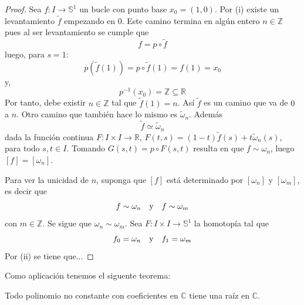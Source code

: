 \documentclass[12pt]{report}
\theoremstyle{largebreak}
\newcommand\cf[3]{\ensuremath{#1:#2\rightarrow#3}}
\begin{document}
    \begin{proof}
        Sea $\cf{f}{I}{\mathbb{S}^1}$ un bucle con punto base $x_0=(1,0)$. Por (i) existe un levantamiento $\widetilde{f}$ empezando en $0$. Este camino termina en algún entero $n\in\mathbb{Z}$ pues al ser levantamiento se cumple que
        \begin{equation*}
            f = p\circ \widetilde{f}
        \end{equation*}
        luego, para $s=1$:
        \begin{equation*}
            p(\widetilde{f}(1))=p\circ\widetilde{f}(1)=f(1)=x_0
        \end{equation*}
        y,
        \begin{equation*}
            p^{-1}(x_0)=\mathbb{Z}\subseteq\mathbb{R}
        \end{equation*}
        Por tanto, debe existir $n\in\mathbb{Z}$ tal que $\widetilde{f}(1)=n$. Así $\widetilde{f}$ es un camino que va de $0$ a $n$. Otro camino que también hace lo mismo es $\widetilde{\omega}_n$. Además
        \begin{equation*}
            \widetilde{f}\simeq \widetilde{\omega}_n
        \end{equation*}
        dada la función continua $\cf{F}{I\times I}{\mathbb{R}}$, $F(t,s)=(1-t)\widetilde{f}(s)+t\widetilde{\omega}_n(s)$, para todo $s,t\in I$. Tomando $G(s,t)=p\circ F(s,t)$ resulta en que $f\sim\omega_n$, luego $[f]=[\omega_n]$.

        Para ver la unicidad de $n$, suponga que $[f]$ está determinado por $[\omega_n]$ y $[\omega_m]$, es decir que
        \begin{equation*}
            f\sim\omega_n\quad\textup{y}\quad f\sim\omega_m
        \end{equation*}
        con $m\in\mathbb{Z}$. Se sigue que $\omega_n\sim\omega_m$. Sea $\cf{F}{I\times I}{\mathbb{S}^1}$ la homotopía tal que
        \begin{equation*}
            f_0=\omega_n\quad\textup{y}\quad f_1=\omega_m
        \end{equation*}
        Por (ii) se tiene que...
    \end{proof}

    Como aplicación tenemos el siguente teorema:

    \begin{theor}
        Todo polinomio no constante con coeficientes en $\mathbb{C}$ tiene una raíz en $\mathbb{C}$.
    \end{theor}
\end{document}
